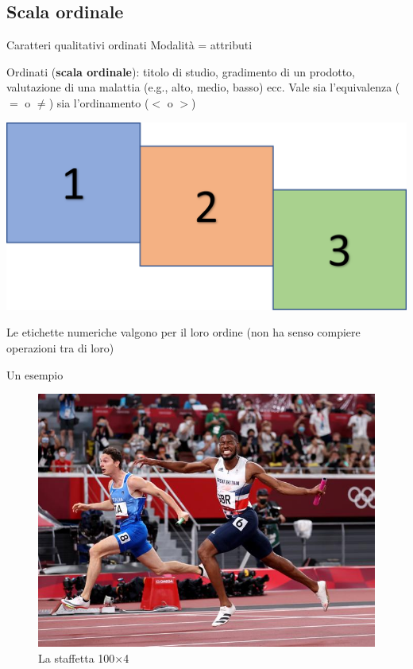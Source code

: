 \documentclass[compress]{beamer}
\begin{document}
\subsection{Scala ordinale}
\begin{frame}{Caratteri qualitativi ordinati}
	Modalità = attributi 
	
	Ordinati (\textbf{scala ordinale}): titolo di studio, gradimento di un prodotto, valutazione di una malattia (e.g., alto, medio, basso) ecc. Vale sia l'equivalenza ($=$ o $\neq$) sia l'ordinamento ($<$ o $>$)
	
	\begin{center}
		\includegraphics[width=.20\linewidth]{ordinale.png}
	\end{center}
	
	Le etichette numeriche valgono per il loro ordine (non ha senso compiere operazioni tra di loro)
\end{frame}

\begin{frame}{Un esempio}
	
	\begin{figure}
		\centering
		\includegraphics[width=0.5\linewidth]{ordinle}
		\caption{La staffetta 100$\times$4}
	\end{figure}
	
\end{frame}
\end{document}
